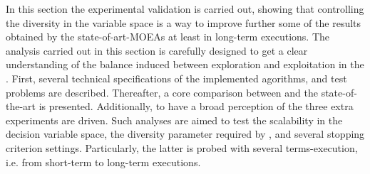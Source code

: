 In this section the experimental validation is carried out, showing that controlling the diversity in the variable space is a way to improve further some of the results obtained by the state-of-art-MOEAs at least in long-term executions.
%
The analysis carried out in this section is carefully designed to get a clear understanding of the balance induced between exploration and exploitation in the \VSDMOEA{}.
%
First, several technical specifications of the implemented agorithms, and test problems are described.
%
Thereafter, a core comparison between \VSDMOEA{} and the state-of-the-art is presented.
%
Additionally, to have a broad perception of the \VSDMOEA{} three extra experiments are driven.
%
Such analyses are aimed to test the scalability in the decision variable space, the diversity parameter required by \VSDMOEA{}, and several stopping criterion settings.
%
Particularly, the latter is probed with several terms-execution, i.e. from short-term to long-term executions.


%
%
%
%
%
%
%
%
%

